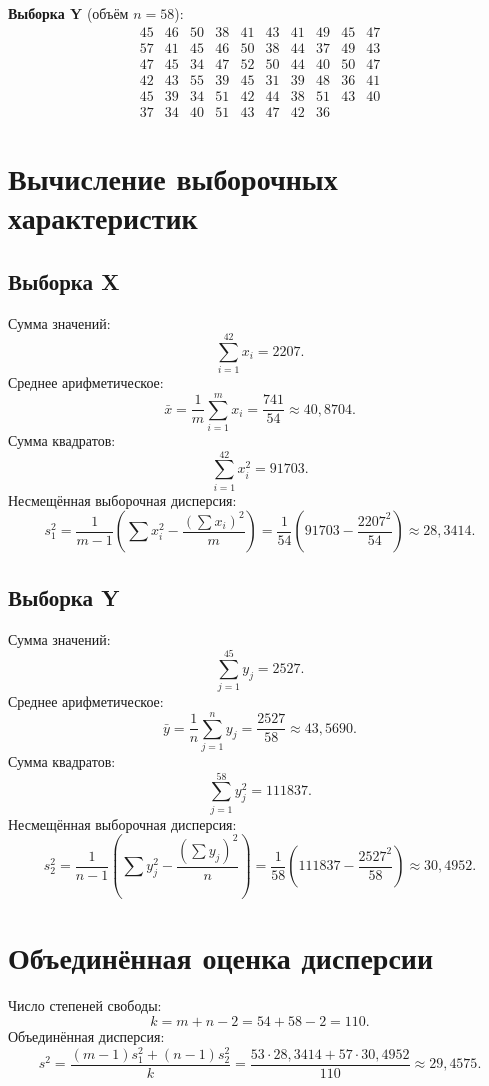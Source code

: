 \documentclass[a4paper,12pt]{article}
\begin{document}
\textbf{Выборка Y} (объём $n = 58$):
\[
\begin{array}{cccccccccc}
45 & 46 & 50 & 38 & 41 & 43 & 41 & 49 & 45 & 47 \\
57 & 41 & 45 & 46 & 50 & 38 & 44 & 37 & 49 & 43 \\
47 & 45 & 34 & 47 & 52 & 50 & 44 & 40 & 50 & 47 \\
42 & 43 & 55 & 39 & 45 & 31 & 39 & 48 & 36 & 41 \\
45 & 39 & 34 & 51 & 42 & 44 & 38 & 51 & 43 & 40 \\
37 & 34 & 40 & 51 & 43 & 47 & 42 & 36
\end{array}
\]

\section*{Вычисление выборочных характеристик}

\subsection*{Выборка X}
Сумма значений:
\[
\sum_{i=1}^{42} x_i = 2207.
\]
Среднее арифметическое:
\[
\bar{x} = \frac{1}{m} \sum_{i=1}^{m} x_i = \frac{741}{54} \approx 40,8704.
\]
Сумма квадратов:
\[
\sum_{i=1}^{42} x_i^2 = 91703.
\]
Несмещённая выборочная дисперсия:
\[
s_1^2 = \frac{1}{m-1} \left( \sum x_i^2 - \frac{(\sum x_i)^2}{m} \right) = \frac{1}{54} \left( 91703 - \frac{2207^2}{54} \right) \approx 28,3414.
\]

\subsection*{Выборка Y}
Сумма значений:
\[
\sum_{j=1}^{45} y_j = 2527.
\]
Среднее арифметическое:
\[
\bar{y} = \frac{1}{n} \sum_{j=1}^{n} y_j = \frac{2527}{58} \approx 43,5690.
\]
Сумма квадратов:
\[
\sum_{j=1}^{58} y_j^2 = 111837.
\]
Несмещённая выборочная дисперсия:
\[
s_2^2 = \frac{1}{n-1} \left( \sum y_j^2 - \frac{(\sum y_j)^2}{n} \right) = \frac{1}{58} \left( 111837 - \frac{2527^2}{58} \right) \approx 30,4952.
\]

\vspace{0.1cm}
\section*{Объединённая оценка дисперсии}

Число степеней свободы:
\[
k = m + n - 2 = 54 + 58 - 2 = 110.
\]
Объединённая дисперсия:
\[
s^2 = \frac{(m-1)s_1^2 + (n-1)s_2^2}{k} = \frac{53 \cdot 28,3414 + 57 \cdot 30,4952}{110} \approx 29,4575.
\]
\end{document}
